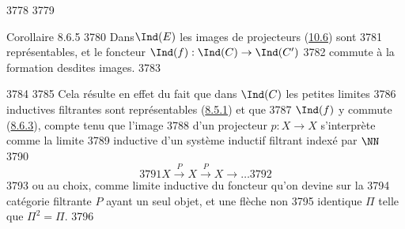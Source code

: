   3778	
  3779	\begin{enonce*}{Corollaire 8.6.5}
  3780	Dans\pageoriginale $\Ind(E)$ les images de projecteurs (\hyperref[I.sec10.6]{10.6}) sont
  3781	représentables, et le foncteur $\Ind(f):\Ind(C)\rightarrow \Ind(C')$
  3782	commute à la formation desdites images.
  3783	\end{enonce*}
  3784	
  3785	Cela résulte en effet du fait que dans $\Ind(C)$ les petites limites
  3786	inductives filtrantes sont représentables (\hyperref[I.prop8.5.1]{8.5.1}) et que
  3787	$\Ind(f)$ y commute (\hyperref[I.prop8.6.3]{8.6.3}), compte tenu que l'image
  3788	d'un projecteur $p:X\rightarrow X$ s'interprète comme la limite
  3789	inductive d'un système inductif filtrant indexé par $\NN$
  3790	$$
  3791	X\xrightarrow{P}X\xrightarrow{P}X\longrightarrow\ldots
  3792	$$
  3793	ou au choix, comme limite inductive du foncteur qu'on devine sur la
  3794	catégorie filtrante $P$ ayant un seul objet, et une flèche non
  3795	identique $\Pi$ telle que $\Pi^2=\Pi$.
  3796	

